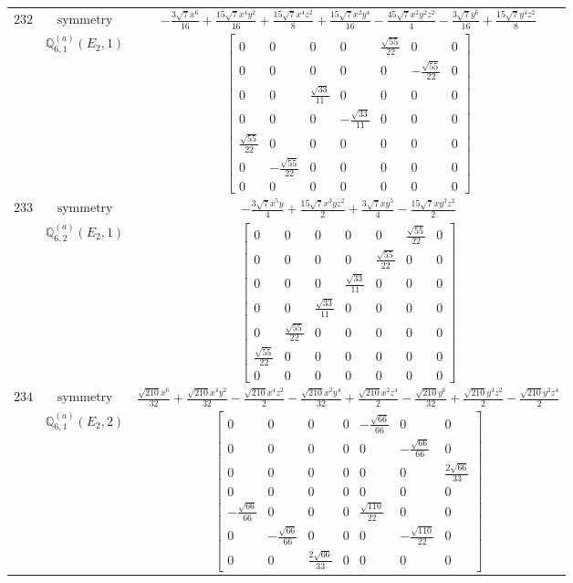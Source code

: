 \documentclass[fleqn,8pt,landscape]{jsarticle}
\begin{document}
\begin{longtable}{ccc}
$ 232 $ & $ \text{symmetry} $ & $ - \frac{3 \sqrt{7} x^{6}}{16} + \frac{15 \sqrt{7} x^{4} y^{2}}{16} + \frac{15 \sqrt{7} x^{4} z^{2}}{8} + \frac{15 \sqrt{7} x^{2} y^{4}}{16} - \frac{45 \sqrt{7} x^{2} y^{2} z^{2}}{4} - \frac{3 \sqrt{7} y^{6}}{16} + \frac{15 \sqrt{7} y^{4} z^{2}}{8} $ \\
$  $ & $ \mathbb{Q}_{6,1}^{(a)}(E_{2},1) $ & $ \begin{bmatrix} 0 & 0 & 0 & 0 & \frac{\sqrt{55}}{22} & 0 & 0 \\ 0 & 0 & 0 & 0 & 0 & - \frac{\sqrt{55}}{22} & 0 \\ 0 & 0 & \frac{\sqrt{33}}{11} & 0 & 0 & 0 & 0 \\ 0 & 0 & 0 & - \frac{\sqrt{33}}{11} & 0 & 0 & 0 \\ \frac{\sqrt{55}}{22} & 0 & 0 & 0 & 0 & 0 & 0 \\ 0 & - \frac{\sqrt{55}}{22} & 0 & 0 & 0 & 0 & 0 \\ 0 & 0 & 0 & 0 & 0 & 0 & 0 \end{bmatrix} $ \\ \hline
$ 233 $ & $ \text{symmetry} $ & $ - \frac{3 \sqrt{7} x^{5} y}{4} + \frac{15 \sqrt{7} x^{3} y z^{2}}{2} + \frac{3 \sqrt{7} x y^{5}}{4} - \frac{15 \sqrt{7} x y^{3} z^{2}}{2} $ \\
$  $ & $ \mathbb{Q}_{6,2}^{(a)}(E_{2},1) $ & $ \begin{bmatrix} 0 & 0 & 0 & 0 & 0 & \frac{\sqrt{55}}{22} & 0 \\ 0 & 0 & 0 & 0 & \frac{\sqrt{55}}{22} & 0 & 0 \\ 0 & 0 & 0 & \frac{\sqrt{33}}{11} & 0 & 0 & 0 \\ 0 & 0 & \frac{\sqrt{33}}{11} & 0 & 0 & 0 & 0 \\ 0 & \frac{\sqrt{55}}{22} & 0 & 0 & 0 & 0 & 0 \\ \frac{\sqrt{55}}{22} & 0 & 0 & 0 & 0 & 0 & 0 \\ 0 & 0 & 0 & 0 & 0 & 0 & 0 \end{bmatrix} $ \\ \hline
$ 234 $ & $ \text{symmetry} $ & $ \frac{\sqrt{210} x^{6}}{32} + \frac{\sqrt{210} x^{4} y^{2}}{32} - \frac{\sqrt{210} x^{4} z^{2}}{2} - \frac{\sqrt{210} x^{2} y^{4}}{32} + \frac{\sqrt{210} x^{2} z^{4}}{2} - \frac{\sqrt{210} y^{6}}{32} + \frac{\sqrt{210} y^{4} z^{2}}{2} - \frac{\sqrt{210} y^{2} z^{4}}{2} $ \\
$  $ & $ \mathbb{Q}_{6,1}^{(a)}(E_{2},2) $ & $ \begin{bmatrix} 0 & 0 & 0 & 0 & - \frac{\sqrt{66}}{66} & 0 & 0 \\ 0 & 0 & 0 & 0 & 0 & - \frac{\sqrt{66}}{66} & 0 \\ 0 & 0 & 0 & 0 & 0 & 0 & \frac{2 \sqrt{66}}{33} \\ 0 & 0 & 0 & 0 & 0 & 0 & 0 \\ - \frac{\sqrt{66}}{66} & 0 & 0 & 0 & \frac{\sqrt{110}}{22} & 0 & 0 \\ 0 & - \frac{\sqrt{66}}{66} & 0 & 0 & 0 & - \frac{\sqrt{110}}{22} & 0 \\ 0 & 0 & \frac{2 \sqrt{66}}{33} & 0 & 0 & 0 & 0 \end{bmatrix} $ \\ \hline

\end{longtable}
\end{document}
